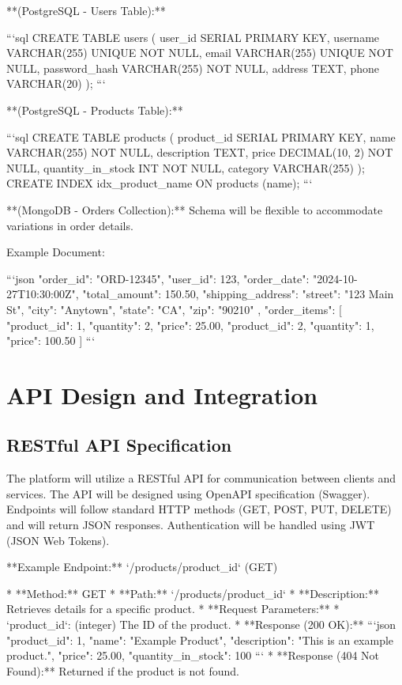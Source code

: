\documentclass[11pt,a4paper,oneside]{article}
\begin{document}
**(PostgreSQL - Users Table):**

```sql
CREATE TABLE users (
    user_id SERIAL PRIMARY KEY,
    username VARCHAR(255) UNIQUE NOT NULL,
    email VARCHAR(255) UNIQUE NOT NULL,
    password_hash VARCHAR(255) NOT NULL,
    address TEXT,
    phone VARCHAR(20)
);
```

**(PostgreSQL - Products Table):**

```sql
CREATE TABLE products (
    product_id SERIAL PRIMARY KEY,
    name VARCHAR(255) NOT NULL,
    description TEXT,
    price DECIMAL(10, 2) NOT NULL,
    quantity_in_stock INT NOT NULL,
    category VARCHAR(255)
);
CREATE INDEX idx_product_name ON products (name);
```

**(MongoDB - Orders Collection):**  Schema will be flexible to accommodate variations in order details.

Example Document:

```json
{
  "order_id": "ORD-12345",
  "user_id": 123,
  "order_date": "2024-10-27T10:30:00Z",
  "total_amount": 150.50,
  "shipping_address": {
    "street": "123 Main St",
    "city": "Anytown",
    "state": "CA",
    "zip": "90210"
  },
  "order_items": [
    {"product_id": 1, "quantity": 2, "price": 25.00},
    {"product_id": 2, "quantity": 1, "price": 100.50}
  ]
}
```

\section{API Design and Integration}

\subsection{RESTful API Specification}

The platform will utilize a RESTful API for communication between clients and services.  The API will be designed using OpenAPI specification (Swagger).  Endpoints will follow standard HTTP methods (GET, POST, PUT, DELETE) and will return JSON responses.  Authentication will be handled using JWT (JSON Web Tokens).

**Example Endpoint:**  `/products/{product_id}` (GET)

* **Method:** GET
* **Path:** `/products/{product_id}`
* **Description:** Retrieves details for a specific product.
* **Request Parameters:**
    * `product_id`: (integer) The ID of the product.
* **Response (200 OK):**
```json
{
  "product_id": 1,
  "name": "Example Product",
  "description": "This is an example product.",
  "price": 25.00,
  "quantity_in_stock": 100
}
```
* **Response (404 Not Found):**  Returned if the product is not found.
\end{document}
